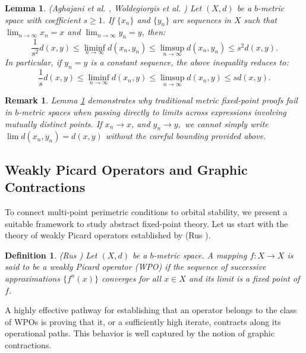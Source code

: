 \documentclass[a4paper,12pt,oneside]{article}
\newtheorem{definition}[theorem]{Definition}
\newtheorem{lemma}[theorem]{Lemma}
\newtheorem{remark}[theorem]{Remark}
\numberwithin{equation}{section}
\begin{document}
\begin{lemma}
\label{lem:tracking}
(Aghajani et al. \cite{aghajani2014}, Woldegiorgis et al. \cite{woldegiorgis2025}) Let $(X,d)$ be a $b$-metric space with coefficient $s \geq 1$. If $\{x_n\}$ and $\{y_n\}$ are sequences in $X$ such that $\lim_{n \to \infty} x_n = x$ and $\lim_{n \to \infty} y_n = y$, then:
\begin{equation}
\frac{1}{s^2} d(x,y)\leq \liminf_{n\to \infty}d(x_n,y_n)\leq \limsup_{n\to \infty}d(x_n,y_n)\leq s^2 d(x,y).
\label{eq:tracking}
\end{equation}
In particular, if $y_n = y$ is a constant sequence, the above inequality reduces to:
\begin{equation}
\frac{1}{s} d(x,y)\leq \liminf_{n\to \infty}d(x_n,y)\leq \limsup_{n\to \infty}d(x_n,y)\leq s d(x,y).
\label{eq:tracking_const}
\end{equation}
\end{lemma}

\begin{remark}
Lemma \ref{lem:tracking} demonstrates why traditional metric fixed-point proofs fail in $b$-metric spaces when passing directly to limits across expressions involving mutually distinct points. If $x_n \to x$, and $y_n \to y,$ we cannot simply write $\lim d(x_n, y_n) = d(x,y)$ without the careful bounding provided above.
\end{remark}

\subsection{Weakly Picard Operators and Graphic Contractions}
To connect multi-point perimetric conditions to orbital stability, we present a suitable framework to study abstract fixed-point theory. Let us start with the theory of weakly Picard operators established by (Rus \cite{rus1993}).

\begin{definition}
\label{def:wpo}
(Rus \cite{rus1993}) Let $(X,d)$ be a $b$-metric space. A mapping $f:X\to X$ is said to be a \emph{weakly Picard operator} (WPO) if the sequence of successive approximations $\{f^{n}(x)\}$ converges for all $x\in X$ and its limit is a fixed point of $f$.
\end{definition}

A highly effective pathway for establishing that an operator belongs to the class of WPOs is proving that it, or a sufficiently high iterate, contracts along its operational paths. This behavior is well captured by the notion of graphic contractions.
\end{document}
